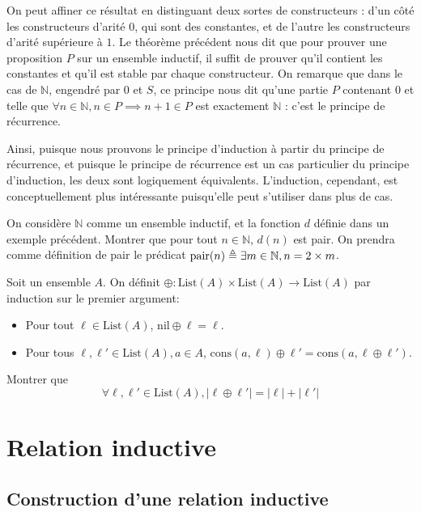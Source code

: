 On peut affiner ce résultat en distinguant deux sortes de constructeurs : d'un
côté les constructeurs d'arité $0$, qui sont des constantes, et de l'autre les
constructeurs d'arité supérieure à $1$. Le théorème précédent nous dit que pour
prouver une proposition $P$ sur un ensemble inductif, il suffit de prouver qu'il
contient les constantes et qu'il est stable par chaque constructeur. On remarque
que dans le cas de $\mathbb N$, engendré par $0$ et $S$, ce principe nous dit
qu'une partie $P$ contenant $0$ et telle que
$\forall n\in\mathbb N, n\in P \implies n+1\in P$ est exactement $\mathbb N$ :
c'est le principe de récurrence.

Ainsi, puisque nous prouvons le principe d'induction à partir du principe de
récurrence, et puisque le principe de récurrence est un cas particulier du
principe d'induction, les deux sont logiquement équivalents. L'induction,
cependant, est conceptuellement plus intéressante puisqu'elle peut s'utiliser
dans plus de cas.

\begin{exercise}
  On considère $\mathbb N$ comme un ensemble inductif, et la fonction $d$
  définie dans un exemple précédent. Montrer que pour tout $n \in \mathbb N$,
  $d(n)$ est pair. On prendra comme définition de pair le prédicat
  $\mathrm{pair}(n) \triangleq \exists m\in\mathbb N, n = 2 \times m$.
\end{exercise}

\begin{exercise}
  Soit un ensemble $A$. On définit
  $\oplus : \mathrm{List}(A) \times \mathrm{List}(A)\to \mathrm{List}(A)$ par
  induction sur le premier argument:
  \begin{itemize}
  \item Pour tout $\ell\in \mathrm{List}(A)$, $\mathrm{nil} \oplus \ell = \ell$.
  \item Pour tous $\ell,\ell'\in\mathrm{List}(A), a\in A$,
    $\mathrm{cons}(a,\ell) \oplus \ell' = \mathrm{cons}(a,\ell \oplus \ell')$.
  \end{itemize}

  Montrer que
  \[\forall \ell,\ell'\in \mathrm{List}(A), |\ell\oplus \ell'|=|\ell|+|\ell'|\]
\end{exercise}

\section{Relation inductive}

\subsection{Construction d'une relation inductive}

